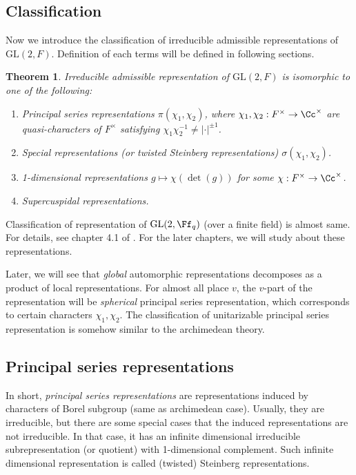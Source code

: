 \documentclass{article}
\newtheorem{theorem}{Theorem}[section]
\newcommand{\GL}{\mathrm{GL}}
\begin{document}
\subsection{Classification}
Now we introduce the classification of irreducible admissible representations of $\GL(2, F)$. Definition of each terms will be defined in following sections. 
\begin{theorem}
Irreducible admissible representation of $\GL(2, F)$ is isomorphic to one of the following:
\begin{enumerate}
\item Principal series representations $\pi(\chi_{1}, \chi_{2})$, where $\chi_{1}, \chi_{2}:F^{\times} \to \Cc^{\times}$ are quasi-characters of $F^{\times}$ satisfying $\chi_{1}\chi_{2}^{-1} \neq |\cdot |^{\pm 1}$. 
\item Special representations (or twisted Steinberg representations) $\sigma(\chi_{1}, \chi_{2})$. 
\item 1-dimensional representations $g\mapsto \chi(\det(g))$ for some $\chi:F^{\times}\to \Cc^{\times}$. 
\item Supercuspidal representations.
\end{enumerate}
\end{theorem}
Classification of representation of $\GL(2, \Ff_{q})$ (over a finite field) is almost same. For details, see chapter 4.1 of \cite{bu}. For the later chapters, we will study about these representations. 

Later, we will see that \emph{global} automorphic representations decomposes as a product of local representations. For almost all place $v$, the $v$-part of the representation will be \emph{spherical} principal series representation, which corresponds to certain characters $\chi_1, \chi_2$. 
The classification of unitarizable principal series representation is somehow similar to the archimedean theory.


\subsection{Principal series representations}
In short, \emph{principal series representations} are representations induced by characters of Borel subgroup (same as archimedean case). 
Usually, they are irreducible, but there are some special cases that the induced representations are not irreducible. In that case, it has an infinite dimensional irreducible subrepresentation (or quotient) with 1-dimensional complement. Such infinite dimensional representation is called (twisted) Steinberg representations. 
\end{document}
